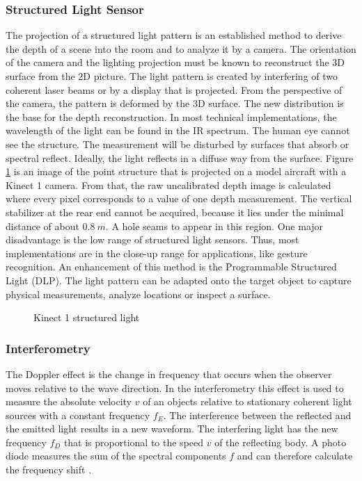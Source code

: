 \subsubsection{Structured Light Sensor}
The projection of a structured light pattern is an established method to derive the depth of a scene into the room and to analyze it by a camera. The orientation of the camera and the lighting projection must be known to reconstruct the 3D surface from the 2D picture. The light pattern is created by interfering of two coherent laser beams or by a display that is projected. From the perspective of the camera, the pattern is deformed by the 3D surface. The new distribution is the base for the depth reconstruction. In most technical implementations, the wavelength of the light can be found in the IR spectrum. The human eye cannot see the structure. The measurement will be disturbed by surfaces that absorb or spectral reflect. Ideally, the light reflects in a diffuse way from the surface. Figure \ref{fig:Kinect1_structured_light} is an image of the point structure that is projected on a model aircraft with a Kinect 1 camera. From that, the raw uncalibrated depth image is calculated where every pixel corresponds to a value of one depth measurement. The vertical stabilizer at the rear end cannot be acquired, because it lies under the minimal distance of about $0.8~m$. A hole seams to appear in this region. One major disadvantage is the low range of structured light sensors. Thus, most implementations are in the close-up range for applications, like gesture recognition. An enhancement of this method is the Programmable Structured Light (DLP). The light pattern can be adapted onto the target object to capture physical measurements, analyze locations or inspect a surface.

\begin{figure}[!h]
	\hfill
	\caption{Kinect 1 structured light}
	\centering
	\label{fig:Kinect1_structured_light}
\end{figure}
\newpage

\subsubsection{Interferometry}
The Doppler effect is the change in frequency that occurs when the observer moves relative to the wave direction. In the interferometry this effect is used to measure the absolute velocity $v$ of an objects relative to stationary coherent light sources with a constant frequency $f_E$. The interference between the reflected and the emitted light results in a new waveform. The interfering light has the new frequency $f_D$ that is proportional to the speed $v$ of the reflecting body. A photo diode measures the sum of the spectral components $f$ and can therefore calculate the frequency shift \cite{CLVpolytec}.

